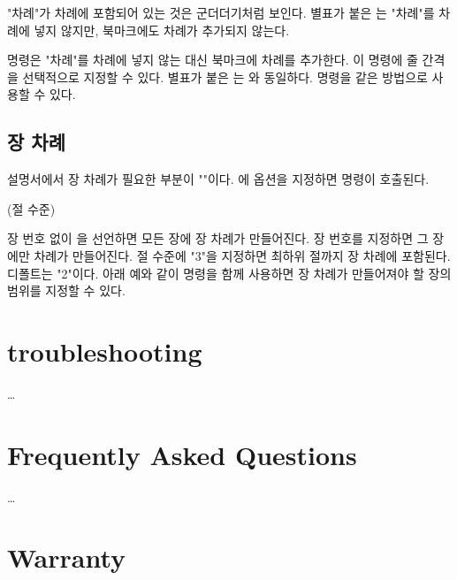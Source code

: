 \documentclass[pairquote, minted]{hzguide}
\begin{document}
"차례"가 차례에 포함되어 있는 것은 군더더기처럼 보인다.
별표가 붙은 \macro{\tableofcontents*}는 "차례"를 차례에 넣지 않지만, 북마크에도 차례가 추가되지 않는다.

\begin{code}
\TableOfContents[줄 간격]
\TableOfContents*[1.1]
\ListOfFigures[줄 간격]
\end{code}

\macro{\TableOfContents} 명령은 "차례"를 차례에 넣지 않는 대신 북마크에 차례를 추가한다.
이 명령에 줄 간격을 선택적으로 지정할 수 있다.
별표가 붙은 \macro{\TableOfContents*}는 \macro{\tableofcontents}와 동일하다.
\macro{\ListOfFigures} 명령을 같은 방법으로 사용할 수 있다.

\section{장 차례}

설명서에서 장 차례가 필요한 부분이 ""이다.
\macro{\HeadingSetup}에  옵션을 지정하면 \macro{\ChapterContentsEnable} 명령이 호출된다.

\begin{code}
\ChapterContentsEnable[장 번호](절 수준)
\ChapterContentsDisable
\end{code}

장 번호 없이 \macro{\ChapterContentsEnable}을 선언하면 모든 장에 장 차례가 만들어진다.
장 번호를 지정하면 그 장에만 차례가 만들어진다.
절 수준에 "3"을 지정하면 최하위 절\annotate*{\string\subsubsection}까지 장 차례에 포함된다.
디폴트는 "2"\annotate*{\string\subsection}이다.
아래 예와 같이 \macro{\ChapterContentsDisable} 명령을 함께 사용하면 장 차례가 만들어져야 할 장의 범위를 지정할 수 있다.

\begin{code}
\ChapterContentsEnable
\chapter{troubleshooting}
… 
\chapter{Frequently Asked Questions}
…
\ChapterContentsDisable
\chapter{Warranty}
\end{code}
\end{document}
